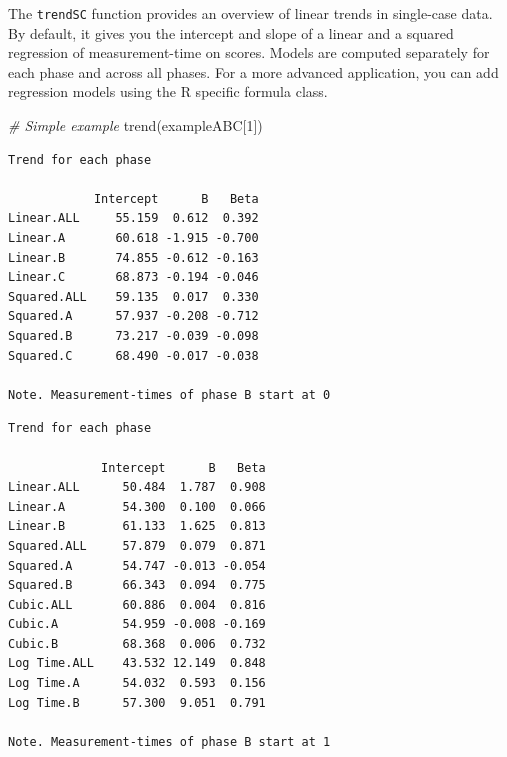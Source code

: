 \documentclass[
]{book}
\newenvironment{Shaded}{\begin{snugshade}}{\end{snugshade}}
\newcommand{\AttributeTok}[1]{\textcolor[rgb]{0.77,0.63,0.00}{#1}}
\newcommand{\CommentTok}[1]{\textcolor[rgb]{0.56,0.35,0.01}{\textit{#1}}}
\newcommand{\DecValTok}[1]{\textcolor[rgb]{0.00,0.00,0.81}{#1}}
\newcommand{\FunctionTok}[1]{\textcolor[rgb]{0.00,0.00,0.00}{#1}}
\newcommand{\NormalTok}[1]{#1}
\newcommand{\OtherTok}[1]{\textcolor[rgb]{0.56,0.35,0.01}{#1}}
\newcommand{\SpecialCharTok}[1]{\textcolor[rgb]{0.00,0.00,0.00}{#1}}
\newcommand{\StringTok}[1]{\textcolor[rgb]{0.31,0.60,0.02}{#1}}
\begin{document}
The \texttt{trendSC} function provides an overview of linear trends in single-case data. By default, it gives you the intercept and slope of a linear and a squared regression of measurement-time on scores. Models are computed separately for each phase and across all phases. For a more advanced application, you can add regression models using the R specific formula class.

\begin{Shaded}
\begin{Highlighting}[]
\CommentTok{\# Simple example}
\FunctionTok{trend}\NormalTok{(exampleABC[}\DecValTok{1}\NormalTok{])}
\end{Highlighting}
\end{Shaded}

\begin{verbatim}
Trend for each phase

            Intercept      B   Beta
Linear.ALL     55.159  0.612  0.392
Linear.A       60.618 -1.915 -0.700
Linear.B       74.855 -0.612 -0.163
Linear.C       68.873 -0.194 -0.046
Squared.ALL    59.135  0.017  0.330
Squared.A      57.937 -0.208 -0.712
Squared.B      73.217 -0.039 -0.098
Squared.C      68.490 -0.017 -0.038

Note. Measurement-times of phase B start at 0 
\end{verbatim}

\begin{Shaded}
\end{Shaded}

\begin{verbatim}
Trend for each phase

             Intercept      B   Beta
Linear.ALL      50.484  1.787  0.908
Linear.A        54.300  0.100  0.066
Linear.B        61.133  1.625  0.813
Squared.ALL     57.879  0.079  0.871
Squared.A       54.747 -0.013 -0.054
Squared.B       66.343  0.094  0.775
Cubic.ALL       60.886  0.004  0.816
Cubic.A         54.959 -0.008 -0.169
Cubic.B         68.368  0.006  0.732
Log Time.ALL    43.532 12.149  0.848
Log Time.A      54.032  0.593  0.156
Log Time.B      57.300  9.051  0.791

Note. Measurement-times of phase B start at 1 
\end{verbatim}
\end{document}
